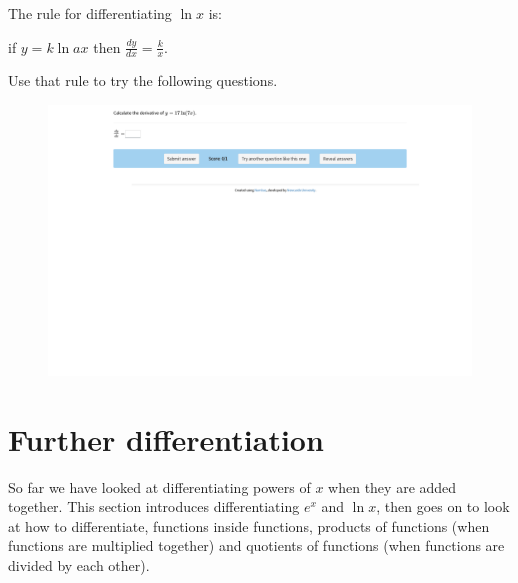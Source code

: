 \documentclass[
  a4paper,
]{scrbook}
\begin{document}
The rule for differentiating \(\ln{x}\) is:

\begin{tcolorbox}[enhanced jigsaw, opacityback=0, left=2mm, toptitle=1mm, title=\textcolor{quarto-callout-note-color}{\faInfo}\hspace{0.5em}{Key point:}, breakable, colbacktitle=quarto-callout-note-color!10!white, opacitybacktitle=0.6, bottomtitle=1mm, arc=.35mm, colback=white, leftrule=.75mm, bottomrule=.15mm, colframe=quarto-callout-note-color-frame, rightrule=.15mm, titlerule=0mm, toprule=.15mm, coltitle=black]
if \(y = k\ln{ax}\) then \(\frac{dy}{dx}= \frac{k}{x}\).
\end{tcolorbox}

Use that rule to try the following questions.

\begin{figure}

{\centering 

\href{https://numbas.mathcentre.ac.uk/question/62763/differentiation-using-a-table-of-derivatives-3/embed/?token=187473c8-cd94-4a87-b1cc-5f134572c64b}{\includegraphics{./11-logarithms_files/figure-pdf/unnamed-chunk-3-1.png}}

}

\end{figure}


\hypertarget{further-differentiation}{%
\chapter{Further differentiation}\label{further-differentiation}}

So far we have looked at differentiating powers of \(x\) when they are
added together. This section introduces differentiating \(e^x\) and
\(\ln{x}\), then goes on to look at how to differentiate, functions
inside functions, products of functions (when functions are multiplied
together) and quotients of functions (when functions are divided by each
other).
\end{document}
